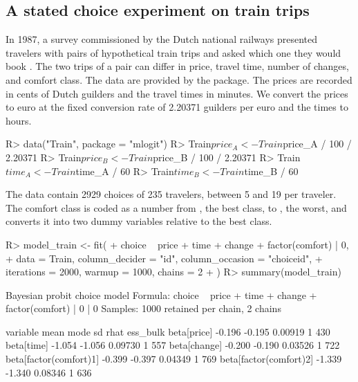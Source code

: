\documentclass[article,shortnames]{jss}
\begin{document}
\subsection{A stated choice experiment on train trips} \label{sec:fit_train}

In 1987, a survey commissioned by the Dutch national railways presented
travelers with pairs of hypothetical train trips and asked which one they would
book \citep{BenAkiva1993}. The two trips of a pair can differ in price, travel
time, number of changes, and comfort class. The  data are provided
by the  package. The prices are recorded in cents of Dutch guilders
and the travel times in minutes. We convert the prices to euro at the fixed
conversion rate of 2.20371 guilders per euro and the times to hours.
%
\begin{Schunk}
\begin{Sinput}
R> data("Train", package = "mlogit")
R> Train$price_A <- Train$price_A / 100 / 2.20371
R> Train$price_B <- Train$price_B / 100 / 2.20371
R> Train$time_A <- Train$time_A / 60
R> Train$time_B <- Train$time_B / 60
\end{Sinput}
\end{Schunk}
%
The data contain 2929 choices of 235
travelers, between 5 and 19
per traveler. The comfort class is coded as a number from , the best
class, to , the worst, and  converts it into two
dummy variables relative to the best class.
%
\begin{Schunk}
\begin{Sinput}
R> model_train <- fit(
+    choice ~ price + time + change + factor(comfort) | 0,
+    data = Train, column_decider = "id", column_occasion = "choiceid",
+    iterations = 2000, warmup = 1000, chains = 2
+  )
R> summary(model_train)
\end{Sinput}
\begin{Soutput}
Bayesian probit choice model
Formula: choice ~ price + time + change + factor(comfort) | 0 | 0 
Samples: 1000 retained per chain, 2 chains

               variable   mean   mode      sd rhat ess_bulk
            beta[price] -0.196 -0.195 0.00919    1      430
             beta[time] -1.054 -1.056 0.09730    1      557
           beta[change] -0.200 -0.190 0.03526    1      722
 beta[factor(comfort)1] -0.399 -0.397 0.04349    1      769
 beta[factor(comfort)2] -1.339 -1.340 0.08346    1      636
\end{Soutput}
\end{Schunk}
\end{document}
